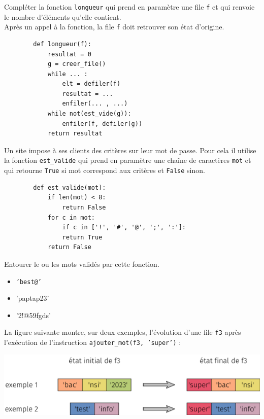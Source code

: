 \documentclass[a4paper,12pt,article,firamath]{nsi}
\begin{document}

\question Compléter la fonction \texttt{longueur}  qui prend en
paramètre une file \texttt{f}  et qui renvoie le nombre d'éléments qu'elle contient.\\
Après un appel à la fonction, la file \texttt{f}  doit retrouver son état d'origine.\\

\begin{pyc}
    \begin{verbatim}
        def longueur(f):
            resultat = 0
            g = creer_file()
            while ... :
                elt = defiler(f)
                resultat = ...
                enfiler(... , ...)
            while not(est_vide(g)):
                enfiler(f, defiler(g))
            return resultat
    \end{verbatim}
\end{pyc}

Un site impose à ses clients des critères sur leur mot de passe. Pour cela il utilise
la fonction \texttt{est_valide}  qui prend en paramètre une chaîne de caractères \texttt{mot}  et qui retourne \texttt{True}  si mot correspond aux critères et \texttt{False}  sinon.

\begin{pyc}
    \begin{verbatim}
        def est_valide(mot):
            if len(mot) < 8:
                return False
            for c in mot:
                if c in ['!', '#', '@', ';', ':']:
                return True
            return False
    \end{verbatim}
\end{pyc}

\question Entourer le ou les mots validés par cette fonction.

\begin{itemize}
    \item \texttt{'best@'}
    \item 'paptap23'
    \item '2!@59fgds' 
\end{itemize}

La figure suivante montre, sur deux exemples, l'évolution d'une file \texttt{f3}  après
l'exécution de l'instruction \texttt{ajouter_mot(f3, 'super')}  :
\begin{center}
    \includegraphics[width = 15cm]{img/fig03.png}
\end{center}
\end{document}

